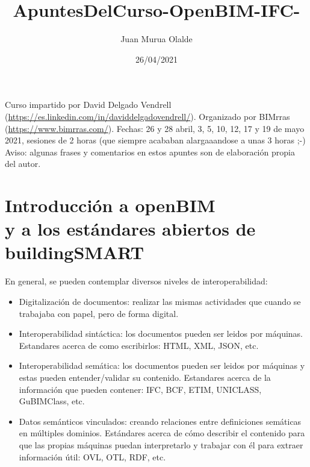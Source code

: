 \documentclass[spanish,10pt,a4paper,final,oneside]{article}
\title{ApuntesDelCurso-OpenBIM-IFC-}
\author{Juan Murua Olalde}
\date{26/04/2021}
\begin{document}
\begin{center}\begin{LARGE}
\MyTitle
\end{LARGE}\end{center}
\begin{footnotesize}
\end{footnotesize}

\vspace{1cm}
Curso impartido por David Delgado Vendrell (\url{https://es.linkedin.com/in/daviddelgadovendrell/}). Organizado por BIMrras (\url{https://www.bimrras.com/}). Fechas: 26 y 28 abril,  3, 5, 10, 12, 17 y 19 de mayo 2021, sesiones de 2 horas (que siempre acababan alargaaandose a unas 3 horas ;-)
\\Aviso: algunas frases y comentarios en estos apuntes son de elaboración propia del autor.

\hypersetup{linkcolor=black}
\tableofcontents
\vspace{1cm}


\newpage


\section{Introducción a openBIM \\ y a los estándares abiertos de buildingSMART}


En general, se pueden contemplar diversos niveles de interoperabilidad:
\begin{itemize}
\item Digitalización de documentos: realizar las mismas actividades que cuando se trabajaba con papel, pero de forma digital.

\item Interoperabilidad sintáctica: los documentos pueden ser leidos por máquinas. Estandares acerca de como escribirlos: HTML, XML, JSON, etc.

\item Interoperabilidad semática: los documentos pueden ser leidos por máquinas y estas pueden entender/validar su contenido. Estandares acerca de la información que pueden contener: IFC, BCF, ETIM, UNICLASS, GuBIMClass, etc.  

\item Datos semánticos vinculados: creando relaciones entre definiciones semáticas en múltiples dominios. Estándares acerca de cómo describir el contenido para que las propias máquinas puedan interpretarlo y trabajar con él para extraer información útil: OVL, OTL, RDF, etc.
\end{itemize}
\end{document}
